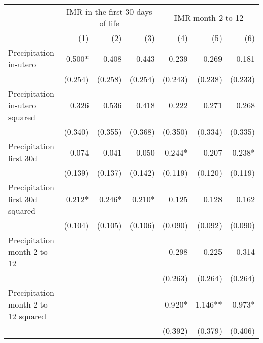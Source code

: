 \begin{tabular}{lrrrrrr}
\toprule
                                            &      \multicolumn{3}{c}{IMR in the first 30 days of life}     &   \multicolumn{3}{c}{IMR month 2 to 12}      \\ 
\cmidrule(lr){2-4} \cmidrule(lr){5-7} 
                                            &         (1) &         (2) &          (3) &          (4) &          (5) &          (6) \\ 
\midrule
Precipitation in-utero                      &      0.500* &       0.408 &        0.443 &       -0.239 &       -0.269 &       -0.181 \\ 
                                            &     (0.254) &     (0.258) &      (0.254) &      (0.243) &      (0.238) &      (0.233) \\ 
Precipitation in-utero squared              &       0.326 &       0.536 &        0.418 &        0.222 &        0.271 &        0.268 \\ 
                                            &     (0.340) &     (0.355) &      (0.368) &      (0.350) &      (0.334) &      (0.335) \\ 
Precipitation first 30d                     &      -0.074 &      -0.041 &       -0.050 &       0.244* &        0.207 &       0.238* \\ 
                                            &     (0.139) &     (0.137) &      (0.142) &      (0.119) &      (0.120) &      (0.119) \\ 
Precipitation first 30d squared             &      0.212* &      0.246* &       0.210* &        0.125 &        0.128 &        0.162 \\ 
                                            &     (0.104) &     (0.105) &      (0.106) &      (0.090) &      (0.092) &      (0.090) \\ 
Precipitation month 2 to 12                 &             &             &              &        0.298 &        0.225 &        0.314 \\ 
                                            &             &             &              &      (0.263) &      (0.264) &      (0.264) \\ 
Precipitation month 2 to 12 squared         &             &             &              &       0.920* &      1.146** &       0.973* \\ 
                                            &             &             &              &      (0.392) &      (0.379) &      (0.406) \\ 

\end{tabular}
